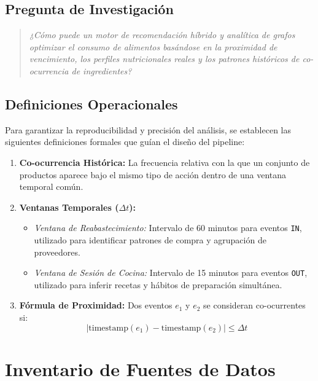 \documentclass[12pt,a4paper]{article}
\newcommand{\code}[1]{\texttt{\small #1}}
\begin{document}
\subsection{Pregunta de Investigación}

\begin{quote}
\textit{¿Cómo puede un motor de recomendación híbrido y analítica de grafos optimizar el consumo de alimentos basándose en la proximidad de vencimiento, los perfiles nutricionales reales y los patrones históricos de co-ocurrencia de ingredientes?}
\end{quote}

\subsection{Definiciones Operacionales}

Para garantizar la reproducibilidad y precisión del análisis, se establecen las siguientes definiciones formales que guían el diseño del pipeline:

\begin{enumerate}
    \item \textbf{Co-ocurrencia Histórica:} La frecuencia relativa con la que un conjunto de productos aparece bajo el mismo tipo de acción dentro de una ventana temporal común.

    \item \textbf{Ventanas Temporales ($\Delta t$):}
    \begin{itemize}
        \item \textit{Ventana de Reabastecimiento:} Intervalo de 60 minutos para eventos \code{IN}, utilizado para identificar patrones de compra y agrupación de proveedores.
        \item \textit{Ventana de Sesión de Cocina:} Intervalo de 15 minutos para eventos \code{OUT}, utilizado para inferir recetas y hábitos de preparación simultánea.
    \end{itemize}

    \item \textbf{Fórmula de Proximidad:} Dos eventos $e_1$ y $e_2$ se consideran co-ocurrentes si:
    \[
    \left| \text{timestamp}(e_1) - \text{timestamp}(e_2) \right| \leq \Delta t
    \]
\end{enumerate}

\section{Inventario de Fuentes de Datos}
\end{document}

